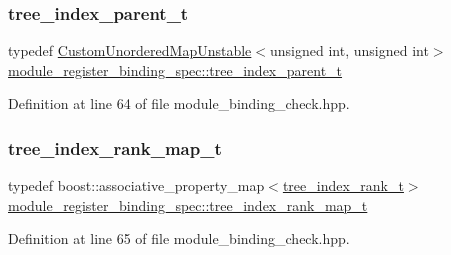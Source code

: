 \subsubsection{\texorpdfstring{tree\+\_\+index\+\_\+parent\+\_\+t}{tree\_index\_parent\_t}}
{\footnotesize\ttfamily typedef \hyperlink{custom__map_8hpp_a8cbaceffc09790a885ec7e9c17809c69}{Custom\+Unordered\+Map\+Unstable}$<$unsigned int, unsigned int$>$ \hyperlink{classmodule__register__binding__spec_a7caa9258582c53bbbb84194770abe960}{module\+\_\+register\+\_\+binding\+\_\+spec\+::tree\+\_\+index\+\_\+parent\+\_\+t}\hspace{0.3cm}{\ttfamily [private]}}



Definition at line 64 of file module\+\_\+binding\+\_\+check.\+hpp.

\mbox{\label{classmodule__register__binding__spec_a8336f338b308445a062ca2f293617f67}} 
\subsubsection{\texorpdfstring{tree\+\_\+index\+\_\+rank\+\_\+map\+\_\+t}{tree\_index\_rank\_map\_t}}
{\footnotesize\ttfamily typedef boost\+::associative\+\_\+property\+\_\+map$<$\hyperlink{classmodule__register__binding__spec_a151eec9e0ca85fdf97be1090bf8d46ad}{tree\+\_\+index\+\_\+rank\+\_\+t}$>$ \hyperlink{classmodule__register__binding__spec_a8336f338b308445a062ca2f293617f67}{module\+\_\+register\+\_\+binding\+\_\+spec\+::tree\+\_\+index\+\_\+rank\+\_\+map\+\_\+t}\hspace{0.3cm}{\ttfamily [private]}}



Definition at line 65 of file module\+\_\+binding\+\_\+check.\+hpp.

\mbox{\label{classmodule__register__binding__spec_a151eec9e0ca85fdf97be1090bf8d46ad}} 
